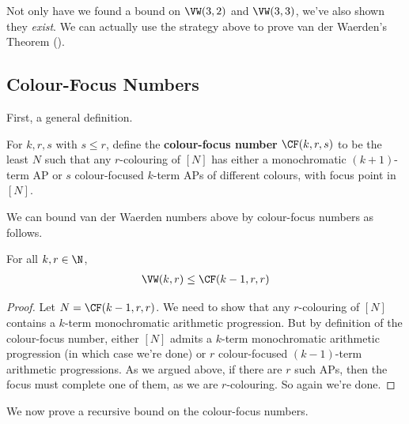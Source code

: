 Not only have we found a bound on $\VW(3, 2)$ and $\VW(3, 3)$, we've also shown they \textit{exist}. We can actually use the strategy above to prove van der Waerden's Theorem ().

\subsection{Colour-Focus Numbers}

First, a general definition.

\begin{boxdefinition}
    For $k, r, s$ with $s \le r$, define the \textbf{colour-focus number} $\CF(k, r, s)$ to be the least $N$ such that any $r$-colouring of $[N]$ has either a monochromatic $(k + 1)$-term AP or $s$ colour-focused $k$-term APs of different colours, with focus point in $[N]$.
\end{boxdefinition}

We can bound van der Waerden numbers above by colour-focus numbers as follows.

\begin{boxlemma}\label{Ch6:Lemma:VW_le_CF}
    For all $k, r \in \N$,
    \begin{align*}
        \VW(k, r) \le \CF(k-1, r, r)
    \end{align*}
\end{boxlemma}
\begin{proof}
    Let $N = \CF(k-1, r, r)$. We need to show that any $r$-colouring of $[N]$ contains a $k$-term monochromatic arithmetic progression. But by definition of the colour-focus number, either $[N]$ admits a $k$-term monochromatic arithmetic progression (in which case we're done) or $r$ colour-focused $(k - 1)$-term arithmetic progressions. As we argued above, if there are $r$ such APs, then the focus must complete one of them, as we are $r$-colouring. So again we're done.
\end{proof}

We now prove a recursive bound on the colour-focus numbers.

